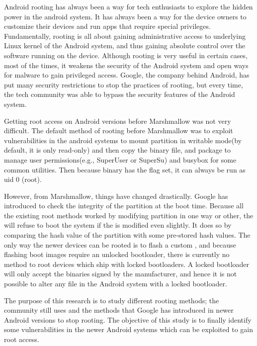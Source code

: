 {
Android rooting has always been a way for tech enthusiasts to explore the hidden power in the android system. It has always been a way for the device owners to customize their devices and run apps that require special privileges. Fundamentally, rooting is all about gaining administrative access to underlying Linux kernel of the Android system, and thus gaining absolute control over the software running on the device. Although rooting is very useful in certain cases, most of the times, it weakens the security of the Android system and open ways for malware to gain privileged access. Google, the company behind Android, has put many security restrictions to stop the practices of rooting, but every time, the tech community was able to bypass the security features of the Android system.

Getting root access on Android versions before Marshmallow was not very difficult. The default method of rooting before Marshmallow was to exploit vulnerabilities in the android systems to mount  partition in writable mode(by default, it is only read-only) and then copy the  binary file, and package to manage user permissions(e.g., SuperUser or SuperSu) and busybox for some common utilities. Then because  binary has the  flag set, it can always be run as uid 0 (root).

However, from Marshmallow, things have changed drastically. Google has introduced  to check the integrity of the  partition at the boot time. Because all the existing root methods worked by modifying  partition in one way or other, the  will refuse to boot the system if the  is modified even slightly. It does so by comparing the hash value of the  partition with some pre-stored hash values. The only way the newer devices can be rooted is to flash a custom , and because flashing boot images require an unlocked bootloader, there is currently no method to root devices which ship with locked bootloaders. A locked bootloader will only accept the binaries signed by the manufacturer, and hence it is not possible to alter any file in the Android system with a locked bootloader.

The purpose of this research is to study different rooting methods; the community still uses and the methods that Google has introduced in newer Android versions to stop rooting. The objective of this study is to finally identify some vulnerabilities in the newer Android systems which can be exploited to gain root access.  

\nocite{*}
}
\vspace{5mm}